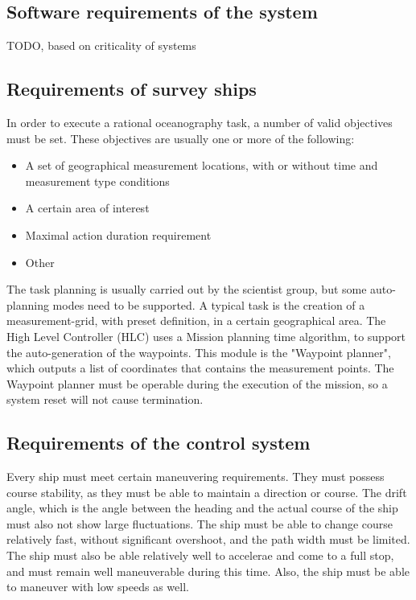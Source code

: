 \subsection{Software requirements of the system}

TODO, based on criticality of systems

\subsection{Requirements of survey ships}

In order to execute a rational oceanography task, a number of valid objectives must be set. These objectives are usually one or more of the following\cite{oceanography}:

\begin{itemize}
\item A set of geographical measurement locations, with or without time and measurement type conditions
\item A certain area of interest
\item Maximal action duration requirement
\item Other
\end{itemize}

The task planning is usually carried out by the scientist group, but some auto-planning modes need to be supported. A typical task is the creation of a measurement-grid, with preset definition, in a certain geographical area. The High Level Controller (HLC) uses a Mission planning time algorithm, to support the auto-generation of the waypoints. This module is the "Waypoint planner", which outputs a list of coordinates that contains the measurement points. The Waypoint planner must be operable during the execution of the mission, so a system reset will not cause termination.

\subsection{Requirements of the control system}

Every ship must meet certain maneuvering requirements\cite[p. 53]{hydromechanics}. They must possess course stability, as they must be able to maintain a direction or course. The drift angle, which is the angle between the heading and the actual course of the ship must also not show large fluctuations. The ship must be able to change course relatively fast, without significant overshoot, and the path width must be limited. The ship must also be able relatively well to accelerae and come to a full stop, and must remain well maneuverable during this time. Also, the ship must be able to maneuver with low speeds as well.

